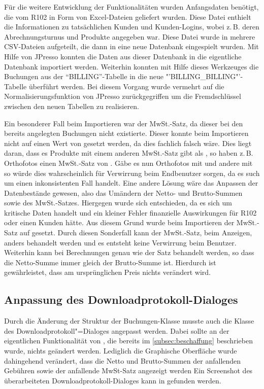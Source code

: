 Für die weitere Entwicklung der Funktionalitäten wurden Anfangsdaten benötigt, die vom R102 in Form von Excel-Dateien geliefert wurden.
Diese Datei enthielt die Informationen zu tatsächlichen Kunden und Kunden-Logins, wobei z.\,B. deren Abrechnungsturnus und Produkte angegeben war.
Diese Datei wurde in mehrere CSV-Dateien aufgeteilt, die dann in eine neue Datenbank eingespielt wurden.
Mit Hilfe von JPresso konnten die Daten aus dieser Datenbank in die eigentliche Datenbank importiert werden.
Weiterhin konnten mit Hilfe dieses Werkzeuges die Buchungen aus der "`BILLING"'-Tabelle in die neue "'BILLING\_BILLING"'-Tabelle überführt werden.
Bei diesem Vorgang wurde vermehrt auf die Normalisierungsfunktion von JPresso zurückgegriffen um die Fremdschlüssel zwischen den neuen Tabellen zu realisieren.

Ein besonderer Fall beim Importieren war der MwSt.-Satz, da dieser bei den bereits angelegten Buchungen nicht existierte.
Dieser konnte beim Importieren nicht auf einen Wert von  gesetzt werden, da dies fachlich falsch wäre.
Dies liegt daran, dass es Produkte mit einem anderen MwSt.-Satz gibt als , so haben z.\,B. Orthofotos einen MwSt.-Satz von .
Gäbe es nun Orthofotos mit  und andere mit  so würde dies wahrscheinlich für Verwirrung beim Endbenutzer sorgen, da es such um einen inkonsistenten Fall handelt.
Eine andere Lösung wäre das Anpassen der Datenbestände gewesen, also das Umändern der Netto- und Brutto-Summen sowie des MwSt.-Satzes. 
Hiergegen wurde sich entschieden, da es sich um kritische Daten handelt und ein kleiner Fehler finanzielle Auswirkungen für R102 oder einen Kunden hätte.
Aus diesem Grund wurde beim Importieren der MwSt.-Satz auf  gesetzt.
Durch diesen Sonderfall kann der MwSt.-Satz, beim Anzeigen, anders behandelt werden und es entsteht keine Verwirrung beim Benutzer.
Weiterhin kann bei Berechnungen  genau wie der Satz  behandelt werden, so dass die Netto-Summe immer gleich der Brutto-Summe ist.
Hierdurch ist gewährleistet, dass am ursprünglichen Preis nichts verändert wird.


\subsection{Anpassung des Downloadprotokoll-Dialoges}
Durch die Änderung der Struktur der Buchungen-Klasse musste auch die Klasse des Downloadprotokoll"=Dialoges  angepasst werden.
Dabei sollte an der eigentlichen Funktionalität von , die bereits im \autoref{subsec:beschaffung} beschrieben wurde, nichts geändert werden.
Lediglich die Graphische Oberfläche wurde dahingehend verändert, dass die Netto und Brutto-Summen der anfallenden Gebühren sowie der anfallende MwSt-Satz angezeigt werden
Ein Screenshot des überarbeiteten Downloadprotokoll-Dialoges kann in  gefunden werden.

